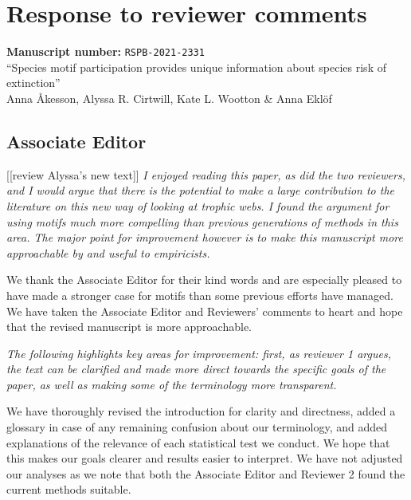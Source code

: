 \documentclass[12pt]{article}
\newcommand{\us}{\rm \setlength{\leftskip}{0.3cm} \setlength{\rightskip}{0.3cm}}
\newcommand{\them}{\it \setlength{\leftskip}{0cm} \setlength{\rightskip}{0cm}}
\begin{document}
 

\section*{Response to reviewer comments}

\begin{flushleft}
\textbf{Manuscript number: } \texttt{RSPB-2021-2331} \\
``Species motif participation provides unique information about species risk of extinction''\\
Anna {\AA}kesson, Alyssa R. Cirtwill, Kate L. Wootton \& Anna Ekl\"of
\end{flushleft}




\subsection*{Associate Editor} [[review Alyssa's new text]]
    \them
    I enjoyed reading this paper, as did the two reviewers, and I would argue that there is the potential to make a large contribution to the literature on this new way of looking at trophic webs. I found the argument for using motifs much more compelling than previous generations of methods in this area. The major point for improvement however is to make this manuscript more approachable by and useful to empiricists.  
    
    \us
    We thank the Associate Editor for their kind words and are especially pleased to have made a stronger case for motifs than some previous efforts have managed. We have taken the Associate Editor and Reviewers' comments to heart and hope that the revised manuscript is more approachable.
    
    \them 
    The following highlights key areas for improvement: first, as reviewer 1 argues, the text can be clarified and made more direct towards the specific goals of the paper, as well as making some of the terminology more transparent.  
    
    \us
    We have thoroughly revised the introduction for clarity and directness, added a glossary in case of any remaining confusion about our terminology, and added explanations of the relevance of each statistical test we conduct. We hope that this makes our goals clearer and results easier to interpret. We have not adjusted our analyses as we note that both the Associate Editor and Reviewer 2 found the current methods suitable.
    
\end{document}
